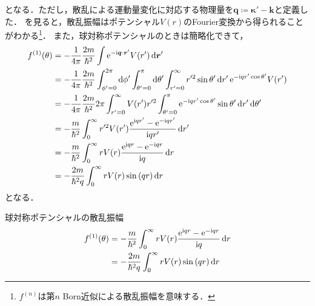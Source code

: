 \documentclass{report}
\begin{document}
  となる．ただし，散乱による運動量変化に対応する物理量を$\bm{q} \coloneqq \bm{\kappa'} - \bm{k}$と定義した．
  を見ると，散乱振幅はポテンシャル$V(r)$のFourier変換から得られることがわかる\footnote{
    $f^{(n)}$は第$n$ Born近似による散乱振幅を意味する．
  }．
  また，球対称ポテンシャルのときは簡略化できて，
  \begin{align}
    f^{(1)}(\theta) &= -\frac{1}{4\pi}\frac{2m}{\hbar^2}\int\mathrm{e}^{-\mathrm{i} \bm{q}\cdot \bm{r}'} V(r') \dd{\bm{r}'}\\
    &= -\frac{1}{4\pi}\frac{2m}{\hbar^2} \int_{\phi' = 0}^{2\pi}\dd{\phi'} \int_{\theta' = 0}^{\pi}\dd{\theta'}\int_{r' = 0}^{\infty}r'^2 \sin\theta' \dd{r'} \mathrm{e}^{-\mathrm{i} qr' \cos\theta'} V(r') \\
    &= -\frac{1}{4\pi}\frac{2m}{\hbar^2} 2\pi \int_{r' = 0}^{\infty}V(r')r'^2\int_{\theta' = 0}^{\pi} \mathrm{e}^{-\mathrm{i} qr' \cos\theta'} \sin\theta' \dd{r'}\dd{\theta'} \\ 
    &= -\frac{m}{\hbar^2} \int_{0}^{\infty} r'^2V(r') \frac{\mathrm{e}^{\mathrm{i} qr'} - \mathrm{e}^{-\mathrm{i} qr'}}{\mathrm{i} qr'} \dd{r'} \\ 
    &= -\frac{m}{\hbar^2} \int_{0}^{\infty} rV(r) \frac{\mathrm{e}^{\mathrm{i} qr} - \mathrm{e}^{-\mathrm{i} qr}}{\mathrm{i} q} \dd{r} \\ 
    &= -\frac{2m}{\hbar^2 q} \int_{0}^{\infty} rV(r)\sin\qty(qr) \dd{r}
  \end{align}
  となる．
  \begin{itembox}[l]{球対称ポテンシャルの散乱振幅}
    \begin{align}
      f^{(1)}(\theta) &= -\frac{m}{\hbar^2} \int_{0}^{\infty} rV(r) \frac{\mathrm{e}^{\mathrm{i} qr} - \mathrm{e}^{-\mathrm{i} qr}}{\mathrm{i} q} \dd{r}\label{SCamp1st-exp} \\ 
      &= -\frac{2m}{\hbar^2 q} \int_{0}^{\infty} rV(r)\sin\qty(qr) \dd{r}\label{SCamp1st-sin}
    \end{align}
  \end{itembox}
\end{document}
